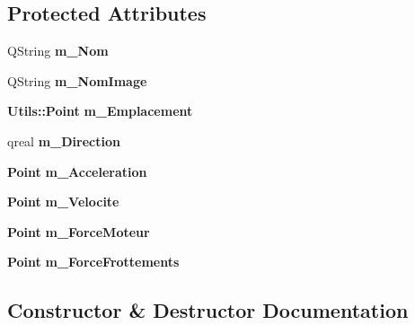 \subsection*{\-Protected \-Attributes}
\begin{DoxyCompactItemize}
\item 
\-Q\-String {\bfseries m\-\_\-\-Nom}\label{class_image_vehicule_a700504cad6dbd663d205e2768531e6a1}

\item 
\-Q\-String {\bfseries m\-\_\-\-Nom\-Image}\label{class_image_vehicule_a3cfe9cdf2bca29acdc4cc806348124af}

\item 
{\bf \-Utils\-::\-Point} {\bfseries m\-\_\-\-Emplacement}\label{class_image_vehicule_a7517120146d2ef8dc77980444172af68}

\item 
qreal {\bfseries m\-\_\-\-Direction}\label{class_image_vehicule_aaa58824ff04f47c3229446bc338745bf}

\item 
{\bf \-Point} {\bfseries m\-\_\-\-Acceleration}\label{class_image_vehicule_a6514962abd6f628a3ec40a279e818075}

\item 
{\bf \-Point} {\bfseries m\-\_\-\-Velocite}\label{class_image_vehicule_a6e20d7d66e1dcf4a07c188a8686eb374}

\item 
{\bf \-Point} {\bfseries m\-\_\-\-Force\-Moteur}\label{class_image_vehicule_a4c7d2413e12e940a9b6245b2f6b4358f}

\item 
{\bf \-Point} {\bfseries m\-\_\-\-Force\-Frottements}\label{class_image_vehicule_a8d653d2e38e7cbc3ff58c315271e3f6f}

\end{DoxyCompactItemize}


\subsection{\-Constructor \& \-Destructor \-Documentation}

